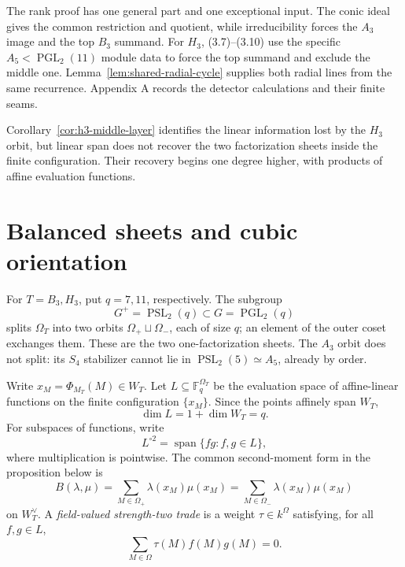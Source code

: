 \documentclass[11pt]{article}
\theoremstyle{definition}
\theoremstyle{remark}
\newcommand{\F}{\mathbb{F}}
\begin{document}
The rank proof has one general part and one exceptional input.  The conic
ideal gives the common restriction and quotient, while irreducibility
forces the \(A_3\) image and the top \(B_3\) summand.  For \(H_3\),
(3.7)--(3.10) use the specific
\(A_5<\operatorname{PGL}_2(11)\) module data to force the top summand and
exclude the middle one.  Lemma~\ref{lem:shared-radial-cycle} supplies both
radial lines from the same recurrence.  Appendix A records the detector
calculations and their finite seams.

Corollary~\ref{cor:h3-middle-layer} identifies the linear information
lost by the \(H_3\) orbit, but linear span does not recover the two
factorization sheets inside the finite configuration.  Their recovery
begins one degree higher, with products of affine evaluation
functions.

\section{Balanced sheets and cubic orientation}
\label{sec:balanced}

For \(T=B_3,H_3\), put \(q=7,11\), respectively.  The subgroup
\[
 G^+=\operatorname{PSL}_2(q)
 \subset G=\operatorname{PGL}_2(q)
\]
splits \(\Omega_T\) into two orbits
\(\Omega_+\sqcup\Omega_-\), each of size \(q\); an element of the outer
coset exchanges them.  These are the two one-factorization sheets.  The
\(A_3\) orbit does not split: its \(S_4\) stabilizer cannot lie in
\(\operatorname{PSL}_2(5)\simeq A_5\), already by order.

Write \(x_M=\Phi_{M_T}(M)\in W_T\).  Let \(L\subseteq\F_q^{\Omega_T}\)
be the evaluation space of affine-linear functions on the finite
configuration \(\{x_M\}\).  Since the points affinely span \(W_T\),
\[
 \dim L=1+\dim W_T=q.
\]
For subspaces of functions, write
\[
 L^{\circ2}=\operatorname{span}\{fg:f,g\in L\},
\]
where multiplication is pointwise.
The common second-moment form in the proposition below is
\[
 B(\lambda,\mu)=\sum_{M\in\Omega_+}\lambda(x_M)\mu(x_M)
               =\sum_{M\in\Omega_-}\lambda(x_M)\mu(x_M)
\]
on \(W_T^\vee\).  A \emph{field-valued strength-two trade} is a
weight \(\tau\in k^\Omega\) satisfying, for all \(f,g\in L\),
\[
 \sum_{M\in\Omega}\tau(M)f(M)g(M)=0.
\]
\end{document}
